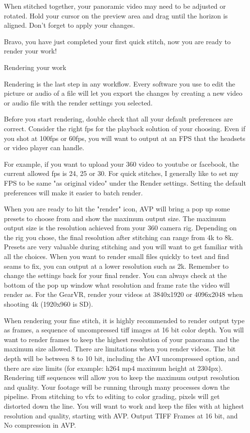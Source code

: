 \begin{fullwidth}
When stitched together, your panoramic video may need to be adjusted or rotated. Hold your cursor on the preview area and drag until the horizon is aligned. Don't forget to apply your changes.

Bravo, you have just completed your first quick stitch, now you are ready to render your work!

{\large Rendering your work \par}

Rendering is the last step in any workflow. Every software you use to edit the picture or audio of a file will let you export the changes by creating a new video or audio file with the render settings you selected.

Before you start rendering, double check that all your default preferences are correct.  Consider the right fps for the playback solution of your choosing. Even if you shot at 100fps or 60fps, you will want to output at an FPS that the headsets or video player can handle. 

For example, if you want to upload your 360 video to youtube or facebook, the current allowed fps is 24, 25 or 30. For quick stitches, I generally like to set my FPS to be same "as original video" under the Render settings. Setting the default preferences will make it easier to batch render.

When you are ready to hit the "render" icon, AVP will bring a pop up some presets to choose from and show the maximum output size. The maximum output size is the resolution achieved from your 360 camera rig. Depending on the rig you chose, the final resolution after stitching can range from 4k to 8k. Presets are very valuable during stitching and you will want to get familiar with all the choices. When you want to render small files quickly to test and find seams to fix, you can output at a lower resolution such as 2k. Remember to change the settings back for your final render. You can always check at the bottom of the pop up window what resolution and frame rate the video will render as. For the GearVR, render your videos at 3840x1920 or 4096x2048 when shooting 4k (1920x960 is SD).

When rendering your fine stitch, it is highly recommended to render output type as frames, a sequence of uncompressed tiff images at 16 bit color depth. You will want to render frames to keep the highest resolution of your panorama and the maximum size allowed. There are limitations when you render videos. The bit depth will be between 8 to 10 bit, including the AVI uncompressed option, and there are size limits (for example: h264 mp4 maximum height at 2304px). Rendering tiff sequences will allow you to keep the maximum output resolution and quality. Your footage will be running through many processes down the pipeline. From stitching to vfx to editing to color grading, pixels will get distorted down the line. You will want to work and keep the files with at highest resolution and quality, starting with AVP. Output TIFF Frames at 16 bit, and No compression in AVP.


\end{fullwidth}
